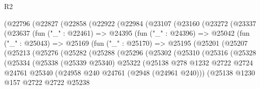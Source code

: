 \begin{lexlean}{R2}
\begin{coremodule}
      (@22796
        (@22827
          (@22858
            (@22922
              (@22984
                (@23107
                  (@23160
                    (@23272
                      (@23337
                        (@23637
                          (fun ("_" : @22461) =>
                          @24395
                            (fun ("_" : @24396) =>
                            @25042
                              (fun ("_" : @25043) =>
                              @25169
                                (fun ("_" : @25170) =>
                                @25195
                                  (@25201
                                    (@25207
                                      (@25213
                                        (@25276
                                          (@25282
                                            (@25288
                                              (@25296
                                                (@25302
                                                  (@25310
                                                    (@25316
                                                      (@25328
                                                        (@25334
                                                          (@25338
                                                            (@25339 @25340)
                                                            @25322
                                                            (@25138
                                                              @278
                                                              @1232
                                                              @2722
                                                              @2724
                                                              @24761
                                                              @25340
                                                              (@24958
                                                                @240
                                                                @24761
                                                                (@2948 (@24961 @240)))
                                                              (@25138
                                                                @1230
                                                                @157
                                                                @2722
                                                                @2722
                                                                @25238

\end{coremodule}
\end{lexlean}

